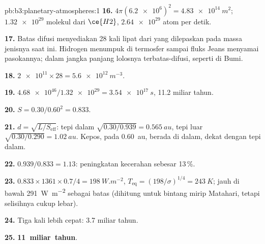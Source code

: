 \begin{solution}{pb:b3:planetary-atmospheres:1}
\textbf{16.} $4\pi(\num{6.2e6})^2 = \qty{4.83e14}{m^2}$; $\num{1.32e29}$ molekul
dari $\ce{H2}$, $\num{2.64e29}$ atom per detik.

\textbf{17.} Batas difusi menyediakan 28 kali lipat dari yang dilepaskan  pada
massa jenisnya saat ini. Hidrogen menumpuk di termosfer sampai
fluks Jeans menyamai pasokannya; dalam jangka panjang lolosnya
terbatas-difusi, seperti di Bumi.

\textbf{18.} $\num{2e11}\times28 = \qty{5.6e12}{m^{-3}}$.

\textbf{19.} $\num{4.68e46}/\num{1.32e29} = \qty{3.54e17}{s}$, 11.2 miliar tahun.

\textbf{20.} $S = 0.30/0.60^2 = 0.833$.

\textbf{21.} $d = \sqrt{L/S_\mathrm{eff}}$: tepi dalam $\sqrt{0.30/0.939} =
\qty{0.565}{au}$, tepi luar $\sqrt{0.30/0.290} = \qty{1.02}{au}$. Kepos,
pada \qty{0.60}{au}, berada di dalam, dekat dengan tepi dalam.

\textbf{22.} $0.939/0.833 = 1.13$: peningkatan kecerahan sebesar 13\,\%.

\textbf{23.} $0.833\times1361\times0.7/4 = \qty{198}{W.m^{-2}}$, $T_\mathrm{eq} =
(198/\sigma)^{1/4} = \qty{243}{K}$; jauh di bawah
\qty{291}{W.m^{-2}} sebagai batas (dihitung untuk bintang mirip Matahari, tetapi
selisihnya cukup lebar).

\textbf{24.} Tiga kali lebih cepat: 3.7 miliar tahun.

\textbf{25.} \textbf{11~miliar~tahun}.
\end{solution}
